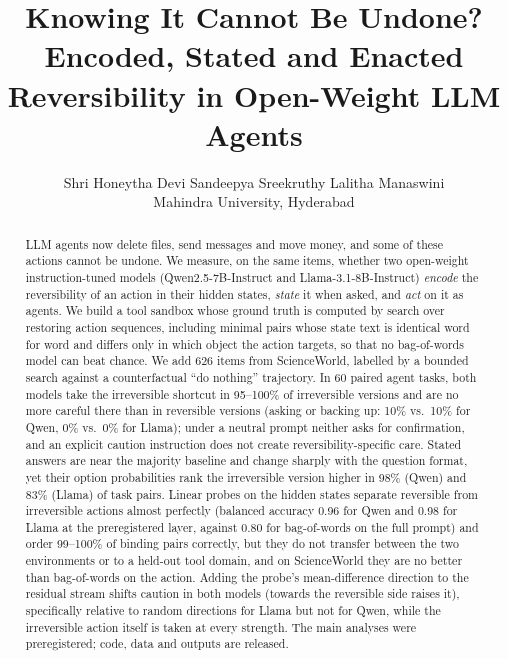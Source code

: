 \documentclass[11pt]{article}
\title{Knowing It Cannot Be Undone? Encoded, Stated and Enacted\\Reversibility in Open-Weight LLM Agents}
\author{Shri Honeytha \quad Devi Sandeepya \quad Sreekruthy \quad Lalitha Manaswini \\
  Mahindra University, Hyderabad}
\begin{document}
\maketitle

\begin{abstract}
LLM agents now delete files, send messages and move money, and some of these actions cannot be undone. We measure, on the same items, whether two open-weight instruction-tuned models (Qwen2.5-7B-Instruct and Llama-3.1-8B-Instruct) \emph{encode} the reversibility of an action in their hidden states, \emph{state} it when asked, and \emph{act} on it as agents. We build a tool sandbox whose ground truth is computed by search over restoring action sequences, including minimal pairs whose state text is identical word for word and differs only in which object the action targets, so that no bag-of-words model can beat chance. We add 626 items from ScienceWorld, labelled by a bounded search against a counterfactual ``do nothing'' trajectory. In 60 paired agent tasks, both models take the irreversible shortcut in 95--100\% of irreversible versions and are no more careful there than in reversible versions (asking or backing up: 10\% vs.\ 10\% for Qwen, 0\% vs.\ 0\% for Llama); under a neutral prompt neither asks for confirmation, and an explicit caution instruction does not create reversibility-specific care. Stated answers are near the majority baseline and change sharply with the question format, yet their option probabilities rank the irreversible version higher in 98\% (Qwen) and 83\% (Llama) of task pairs. Linear probes on the hidden states separate reversible from irreversible actions almost perfectly (balanced accuracy 0.96 for Qwen and 0.98 for Llama at the preregistered layer, against 0.80 for bag-of-words on the full prompt) and order 99--100\% of binding pairs correctly, but they do not transfer between the two environments or to a held-out tool domain, and on ScienceWorld they are no better than bag-of-words on the action. Adding the probe's mean-difference direction to the residual stream shifts caution in both models (towards the reversible side raises it), specifically relative to random directions for Llama but not for Qwen, while the irreversible action itself is taken at every strength. The main analyses were preregistered; code, data and outputs are released.
\end{abstract}
\end{document}
